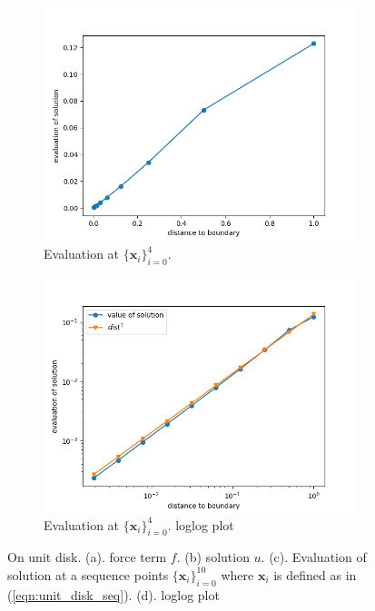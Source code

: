 \documentclass[12pt]{article}%
\theoremstyle{plain}
\numberwithin{equation}{section}
\begin{document}
\begin{figure}[H]
\begin{subfigure}[h]{0.45\linewidth}
\end{subfigure}
\\
\begin{subfigure}[h]{0.45\linewidth}
\caption{Evaluation at $\{\textbf{x}_i\}_{i=0}^4$.}
\includegraphics[width=\linewidth]{figures/Ex3/Ex3_disk_evaluate.png}
\end{subfigure}
\begin{subfigure}[h]{0.45\linewidth}
\caption{Evaluation at $\{\textbf{x}_i\}_{i=0}^4$. loglog plot}
\includegraphics[width=\linewidth]{figures/Ex3/Ex3_disk_evaluate_log.png}
\end{subfigure}
  \caption{On unit disk.   (a). force term $f$. (b) solution $u$. (c). Evaluation of solution at a sequence points $\{\textbf{x}_i\}_{i=0}^{10}$ where $\textbf{x}_i$ is defined as in (\ref{eqn:unit_disk_seq}). (d). loglog plot}
  \label{Ex3_disk_solution}
 \end{figure}
   
\end{document}
